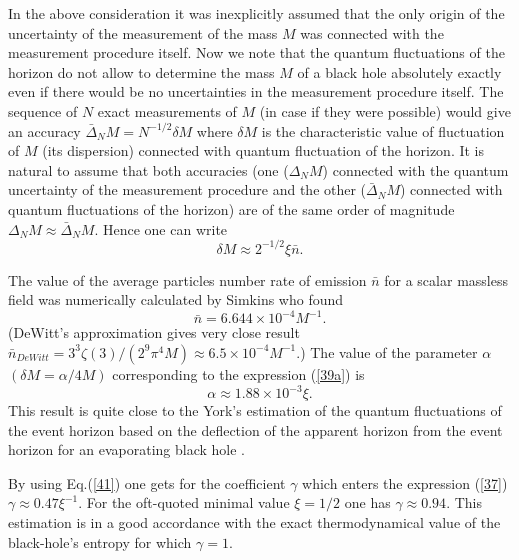 \documentclass[superscriptaddress,showpacs,preprintnumbers,amsmath,amssymb,
nofootinbib,aps,prd,12pt]{revtex4-1}
\begin{document}
In the above consideration it was inexplicitly assumed that the only origin
of the uncertainty of the measurement of the mass $M$ was connected with
the measurement procedure itself.  Now we note
that the quantum fluctuations of the horizon do not allow
to determine the mass $M$ of a black hole absolutely exactly even if there
would be no uncertainties in the measurement procedure itself.
The sequence of $N$ exact measurements of $M$ (in case if they
were possible) would give an accuracy
$\bar{\Delta}_N M =N^{-1/2}\delta M$ where $\delta M$
is the characteristic value of fluctuation of $M$ (its dispersion) connected
with quantum fluctuation of the horizon.
It is natural to assume that both accuracies (one ($\Delta _N M$) connected
with
the quantum uncertainty of the measurement procedure and the other
($\bar{\Delta}_N M$) connected
with quantum fluctuations of the horizon) are of the same order
of magnitude $\Delta _N M\approx \bar{\Delta}_N M$. Hence one can write
\begin{equation}
\delta M \approx 2^{-1/2}\xi \bar{n}. \label{39}
\end{equation}

The value of the average particles number rate of emission $\bar{n}$
for a scalar massless
field was numerically calculated by Simkins \cite{Simk:86} who found
\begin{equation}
\bar{n}=6.644\times 10^{-4}M^{-1} .\label{39a}
\end{equation}
(DeWitt's approximation gives very close result
$\bar{n}_{DeWitt}= 3^3 \zeta (3)/(2^9\pi ^4 M)
\approx 6.5\times 10^{-4}M^{-1}$.) The value of the parameter
$\alpha$ $(\delta M=\alpha /4M)$ corresponding
to the expression (\ref{39a}) is
\begin{equation}
\alpha \approx 1.88\times 10^{-3}\xi .\label{41}
\end{equation}
This result is quite close to the York's estimation of
the quantum fluctuations of the  event horizon based on the  deflection
of the  apparent horizon  from the  event horizon  for an  evaporating
black hole  \cite{York:84}.

By using Eq.(\ref{41})  one gets for  the coefficient $\gamma$  which enters
the
expression  (\ref{37})  $\gamma   \approx   0.47\xi   ^{-1}$.  For    the
oft-quoted  minimal value $\xi =1/2$ one has $\gamma  \approx 0.94$. This
estimation  is   in    a  good    accordance    with      the    exact
thermodynamical   value  of   the black-hole's entropy for which  $\gamma
=1$.
\end{document}
